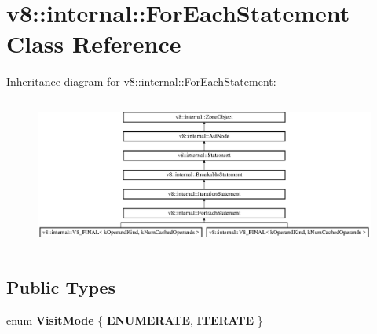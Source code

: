 \hypertarget{classv8_1_1internal_1_1_for_each_statement}{}\section{v8\+:\+:internal\+:\+:For\+Each\+Statement Class Reference}
\label{classv8_1_1internal_1_1_for_each_statement}
Inheritance diagram for v8\+:\+:internal\+:\+:For\+Each\+Statement\+:\begin{figure}[H]
\begin{center}
\leavevmode
\includegraphics[height=5.000000cm]{classv8_1_1internal_1_1_for_each_statement}
\end{center}
\end{figure}
\subsection*{Public Types}
\begin{DoxyCompactItemize}
\item 
\hypertarget{classv8_1_1internal_1_1_for_each_statement_a082216e3ae801be313df6eb024ffa17f}{}enum {\bfseries Visit\+Mode} \{ {\bfseries E\+N\+U\+M\+E\+R\+A\+T\+E}, 
{\bfseries I\+T\+E\+R\+A\+T\+E}
 \}\label{classv8_1_1internal_1_1_for_each_statement_a082216e3ae801be313df6eb024ffa17f}

\end{DoxyCompactItemize}
